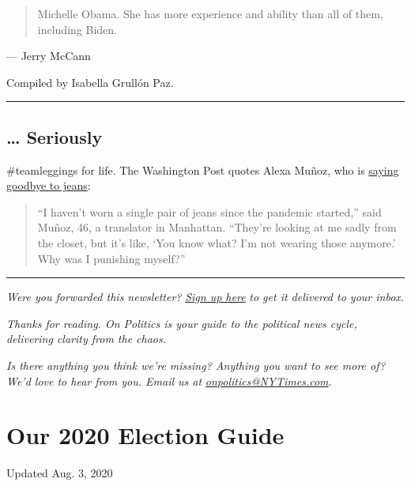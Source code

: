 \begin{quote}
Michelle Obama. She has more experience and ability than all of them,
including Biden.
\end{quote}

--- Jerry McCann

Compiled by Isabella Grullón Paz.

\begin{center}\rule{0.5\linewidth}{\linethickness}\end{center}

\hypertarget{-seriously}{%
\subsection{\ldots{} Seriously}\label{-seriously}}

\#teamleggings for life. The Washington Post quotes Alexa Muñoz, who is
\href{https://www.washingtonpost.com/business/2020/07/28/jeans-sales-leggings-pandemic/}{saying
goodbye to jeans}:

\begin{quote}
``I haven't worn a single pair of jeans since the pandemic started,''
said Muñoz, 46, a translator in Manhattan. ``They're looking at me sadly
from the closet, but it's like, `You know what? I'm not wearing those
anymore.' Why was I punishing myself?''
\end{quote}

\begin{center}\rule{0.5\linewidth}{\linethickness}\end{center}

\emph{Were you forwarded this newsletter?}
\href{https://www.nytimes3xbfgragh.onion/newsletters/politics}{\emph{Sign
up here}} \emph{to get it delivered to your inbox.}

\emph{Thanks for reading. On Politics is your guide to the political
news cycle, delivering clarity from the chaos.}

\emph{Is there anything you think we're missing? Anything you want to
see more of? We'd love to hear from you. Email us at}
\href{mailto:onpolitics@NYTimes.com}{\emph{onpolitics@NYTimes.com}}\emph{.}

\hypertarget{our-2020-election-guide}{%
\section{Our 2020 Election Guide}\label{our-2020-election-guide}}

Updated Aug. 3, 2020

